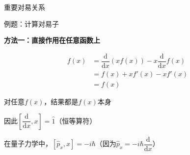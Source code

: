 \documentclass[aspectratio=169, 10pt]{beamer}
\begin{document}
\begin{frame}{重要对易关系}
  
\end{frame}

\begin{frame}{例题：计算对易子}

  \textbf{方法一：直接作用在任意函数上}

  \begin{align*}
    [\dfrac{\mathrm{d}}{\mathrm{d}x}, x]f(x) &= \dfrac{\mathrm{d}}{\mathrm{d}x}(xf(x)) - x\dfrac{\mathrm{d}}{\mathrm{d}x}f(x) \\
                         &= f(x) + xf'(x) - xf'(x) \\
                         &= f(x)
  \end{align*}

  \begin{iqbitemize}
    \item 对任意$f(x)$，结果都是$f(x)$本身
    \item 因此$[\dfrac{\mathrm{d}}{\mathrm{d}x}, x] = \hat{1}$（恒等算符）
  \end{iqbitemize}

  \iqbsep

  在量子力学中，$[\hat{p}_x, x] = -i\hbar$（因为$\hat{p}_x = -i\hbar\dfrac{\mathrm{d}}{\mathrm{d}x}$）
\end{frame}
\end{document}
